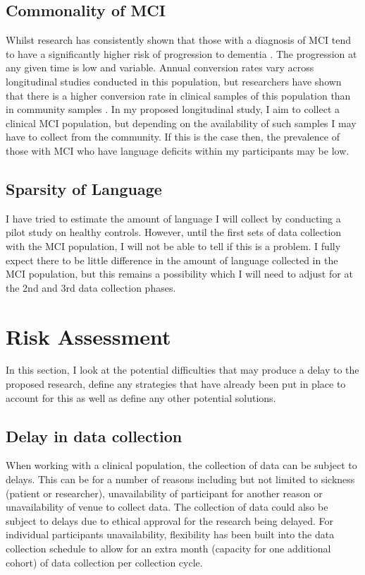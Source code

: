 \documentclass[10pt, letterpaper, twoside, openany]{book}
\begin{document}
\subsection{Commonality of MCI}
Whilst research has consistently shown that those with a diagnosis of MCI tend to have a significantly higher risk of progression to dementia \cite{Roberts2014}. The progression at any given time is low and variable. Annual conversion rates vary across longitudinal studies conducted in this population, but researchers have shown that there is a higher conversion rate in clinical samples of this population than in community samples \cite{Farias2009}. In my proposed longitudinal study, I aim to collect a clinical MCI population, but depending on the availability of such samples I may have to collect from the community. If this is the case then, the prevalence of those with MCI who have language deficits within my participants may be low.
\subsection{Sparsity of Language}
I have tried to estimate the amount of language I will collect by conducting a pilot study on healthy controls. However, until the first sets of data collection with the MCI population, I will not be able to tell if this is a problem. I fully expect there to be little difference in the amount of language collected in the MCI population, but this remains a possibility which I will need to adjust for at the 2nd and 3rd data collection phases. 

\section{Risk Assessment}
In this section, I look at the potential difficulties that may produce a delay to the proposed research, define any strategies that have already been put in place to account for this as well as define any other potential solutions.
\subsection{Delay in data collection}
When working with a clinical population, the collection of data can be subject to delays. This can be for a number of reasons including but not limited to sickness (patient or researcher), unavailability of participant for another reason or unavailability of venue to collect data. The collection of data could also be subject to delays due to ethical approval for the research being delayed. For individual participants unavailability, flexibility has been built into the data collection schedule to allow for an extra month (capacity for one additional cohort) of data collection per collection cycle. 
\end{document}
